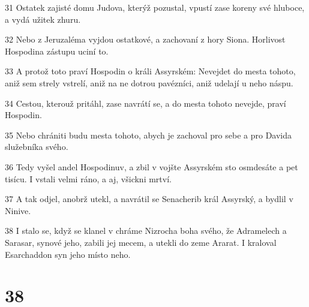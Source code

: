 \par 31 Ostatek zajisté domu Judova, kterýž pozustal, vpustí zase koreny své hluboce, a vydá užitek zhuru.
\par 32 Nebo z Jeruzaléma vyjdou ostatkové, a zachovaní z hory Siona. Horlivost Hospodina zástupu uciní to.
\par 33 A protož toto praví Hospodin o králi Assyrském: Nevejdet do mesta tohoto, aniž sem strely vstrelí, aniž na ne dotrou pavézníci, aniž udelají u neho náspu.
\par 34 Cestou, kterouž pritáhl, zase navrátí se, a do mesta tohoto nevejde, praví Hospodin.
\par 35 Nebo chrániti budu mesta tohoto, abych je zachoval pro sebe a pro Davida služebníka svého.
\par 36 Tedy vyšel andel Hospodinuv, a zbil v vojšte Assyrském sto osmdesáte a pet tisícu. I vstali velmi ráno, a aj, všickni mrtví.
\par 37 A tak odjel, anobrž utekl, a navrátil se Senacherib král Assyrský, a bydlil v Ninive.
\par 38 I stalo se, když se klanel v chráme Nizrocha boha svého, že Adramelech a Sarasar, synové jeho, zabili jej mecem, a utekli do zeme Ararat. I kraloval Esarchaddon syn jeho místo neho.

\chapter{38}

